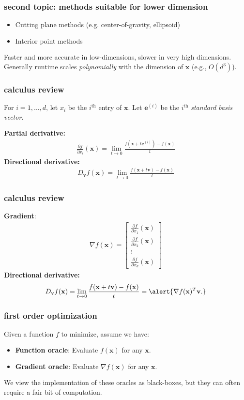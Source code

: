 \documentclass[compress]{beamer}
\newcommand{\bv}[1]{\mathbf{#1}}
\begin{document}
\begin{frame}
	\frametitle{second topic: methods suitable for lower dimension }
	\begin{itemize}
		\item Cutting plane methods (e.g. center-of-gravity, ellipsoid)
		\item Interior point methods
	\end{itemize}
	Faster and more accurate in low-dimensions, slower in very high dimensions. Generally runtime scales \emph{polynomially} with the dimension of $\bv{x}$ (e.g., $O(d^3)$).
\end{frame}

\begin{frame}
	\frametitle{calculus review}
	For $i = 1, \ldots, d$, let $x_i$ be the $i^\text{th}$ entry of $\bv{x}$. Let $\bv{e}^{(i)}$ be the $i^\text{th}$ \emph{standard basis vector.}
	\vspace{2em}
	
	\textbf{Partial derivative:}
	\begin{align*}
		\frac{\partial f}{\partial x_i}(\bv{x}) = \lim_{t\rightarrow 0} \frac{f(\bv{x} + t\bv{e}^{(i)}) - f(\bv{x})}{t}
	\end{align*}
	\textbf{Directional derivative:}
	\begin{align*}
		D_\bv{v}f(\bv{x}) = \lim_{t\rightarrow 0} \frac{f(\bv{x} + t\bv{v}) - f(\bv{x})}{t}
	\end{align*}
\end{frame}

\begin{frame}
	\frametitle{calculus review}
	\textbf{Gradient}:
	\begin{align*}
		\nabla f(\bv{x}) = 
		\begin{bmatrix}
			\frac{\partial f}{\partial x_1}(\bv{x}) \\ \frac{\partial f}{\partial x_2}(\bv{x}) \\ \vdots \\ \frac{\partial f}{\partial x_d}(\bv{x}) 
		\end{bmatrix}
	\end{align*}
	\textbf{Directional derivative:}
	\begin{align*}
		D_\bv{v}f(\bv{x}) = \lim_{t\rightarrow 0} \frac{f(\bv{x} + t\bv{v}) - f(\bv{x})}{t} = \alert{\nabla f(\bv{x})^T \bv{v}.}
	\end{align*}
\end{frame}


\begin{frame}
	\frametitle{first order optimization}
	Given a function $f$ to minimize, assume we have:
	\begin{itemize}
		\item \textbf{Function oracle}: Evaluate $f(\bv{x})$ for any $\bv{x}$. 
		\item \textbf{Gradient oracle}: Evaluate $\nabla f(\bv{x})$ for any $\bv{x}$.
	\end{itemize}
	We view the implementation of these oracles as black-boxes, but they can often require a fair bit of computation. 
\end{frame}
\end{document}
